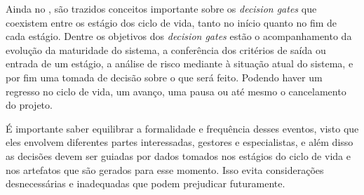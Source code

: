 



	Ainda no \cite{incoseHandbook}, são trazidos conceitos importante sobre os \textit{decision gates} que coexistem entre os estágio dos ciclo de vida, tanto no início quanto no fim de cada estágio.
	Dentre os objetivos dos \textit{decision gates} estão o acompanhamento da evolução da maturidade do sistema, a conferência dos critérios de saída ou entrada de um estágio,
	a análise de risco mediante à situação atual do sistema, e por fim uma tomada de decisão sobre o que será feito. Podendo haver um regresso no ciclo de vida, um avanço, uma pausa 
	ou até mesmo o cancelamento do projeto.

	É importante saber equilibrar a formalidade e frequência desses eventos, visto que eles envolvem diferentes partes interessadas, gestores e especialistas, e além disso as
	decisões devem ser guiadas por dados tomados nos estágios do ciclo de vida e nos artefatos que são gerados para esse momento. Isso evita considerações desnecessárias e 
	inadequadas que podem prejudicar futuramente.

